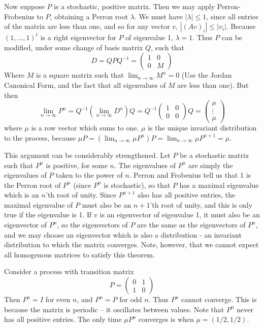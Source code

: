 Now suppose $P$ is a stochastic, positive matrix. Then we may apply Perron-Frobenius to $P$, obtaining a Perron root $\lambda$. We must have $|\lambda| \leq 1$, since all entries of the matrix are less than one, and so for any vector $v$, $|(Av)_i| \leq |v_i|$. Because $(1,\dots,1)^t$ is a right eigenvector for $P$ of eigenvalue 1, $\lambda = 1$. Thus $P$ can be modified, under some change of basis matrix $Q$, such that
%
\[ D = QPQ^{-1} = \begin{pmatrix} 1 & 0 \\0 & M \end{pmatrix} \]
%
Where $M$ is a square matrix such that $\lim_{n \to \infty} M^n = 0$ (Use the Jordan Canonical Form, and the fact that all eigenvalues of $M$ are less than one). But then
%
\[ \lim_{n \to \infty} P^n = Q^{-1} (\lim_{n \to \infty} D^n) Q = Q^{-1} \begin{pmatrix} 1 & 0 \\ 0 & 0 \end{pmatrix} Q = \begin{pmatrix} \mu \\ \vdots \\ \mu \end{pmatrix} \]
%
where $\mu$ is a row vector which sums to one. $\mu$ is the unique invariant distribution to the process, because $\mu P = (\lim_{n \to \infty} \mu P^n) P = \lim_{n \to \infty} \mu P^{n+1} = \mu$.

This argument can be considerably strengthened. Let $P$ be a stochastic matrix such that $P^n$ is positive, for some $n$. The eigenvalues of $P^n$ are simply the eigenvalues of $P$ taken to the power of $n$. Perron and Frobenius tell us that 1 is the Perron root of $P^n$ (since $P^n$ is stochastic), so that $P$ has a maximal eigenvalue which is an $n$'th root of unity. Since $P^{n+1}$ also has all positive entries, the maximal eigenvalue of $P$ must also be an $n+1$'th root of unity, and this is only true if the eigenvalue is 1. If $v$ is an eigenvector of eigenvalue 1, it must also be an eigenvector of $P^n$, so the eigenvectors of $P$ are the same as the eigenvectors of $P^n$, and we may choose an eigenvector which is also a distribution - an invariant distribution to which the matrix converges. Note, however, that we cannot expect all homogenous matrices to satisfy this theorem.

\begin{example}
    Consider a process with transition matrix
    \[ P = \begin{pmatrix} 0 & 1 \\ 1 & 0 \end{pmatrix} \]
    Then $P^n = I$ for even $n$, and $P^n = P$ for odd $n$. Thus $P^n$ cannot converge. This is because the matrix is periodic -- it oscillates between values. Note that $P^n$ never has all positive entries. The only time $\mu P^n$ converges is when $\mu = (1/2, 1/2)$.
\end{example}

